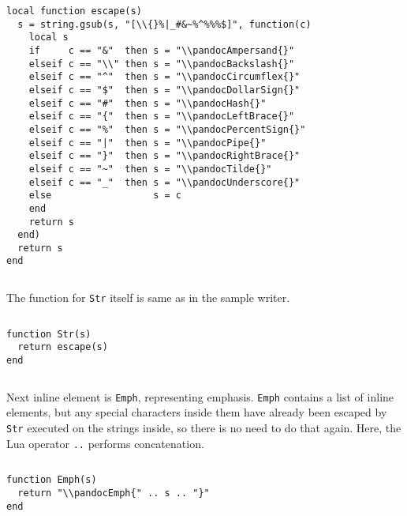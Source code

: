 \documentclass[
  digital,     %
  oneside,     %
  nosansbold,  %
  nocolorbold, %
  lof,         %
  nolot,       %
]{fithesis4}
\begin{document}
$ $

\noindent
\lstset{language=[5.3]Lua}
\begin{lstlisting}
local function escape(s)
  s = string.gsub(s, "[\\{}%|_#&~%^%%%$]", function(c)
    local s
    if     c == "&"  then s = "\\pandocAmpersand{}"
    elseif c == "\\" then s = "\\pandocBackslash{}"
    elseif c == "^"  then s = "\\pandocCircumflex{}"
    elseif c == "$"  then s = "\\pandocDollarSign{}"
    elseif c == "#"  then s = "\\pandocHash{}"
    elseif c == "{"  then s = "\\pandocLeftBrace{}"
    elseif c == "%"  then s = "\\pandocPercentSign{}"
    elseif c == "|"  then s = "\\pandocPipe{}"
    elseif c == "}"  then s = "\\pandocRightBrace{}"
    elseif c == "~"  then s = "\\pandocTilde{}"
    elseif c == "_"  then s = "\\pandocUnderscore{}"
    else                  s = c
    end
    return s
  end)
  return s
end
\end{lstlisting}

$ $

\noindent
The function for \texttt{Str} itself is same as in the sample writer.

$ $

\noindent
\lstset{language=[5.3]Lua}
\begin{lstlisting}
function Str(s)
  return escape(s)
end
\end{lstlisting}

$ $

\noindent
Next inline element is \texttt{Emph}, representing emphasis. \texttt{Emph} contains a list of inline elements, but any special characters inside them have already been escaped by \texttt{Str} executed on the strings inside, so there is no need to do that again. Here, the Lua operator \texttt{..} performs concatenation.

$ $

\noindent
\lstset{language=[5.3]Lua}
\begin{lstlisting}
function Emph(s)
  return "\\pandocEmph{" .. s .. "}"
end
\end{lstlisting}
\end{document}
